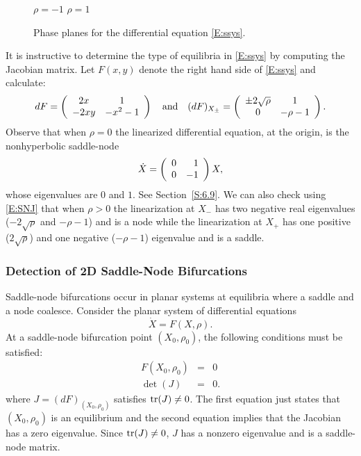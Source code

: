 \documentclass{ximera}
\begin{document}
\begin{figure*}[htb]
           \centerline{%
	   }
		\vspace*{-0.2in}		
		\hspace{1.3in} $\rho=-1$ \hspace{2.1in} $\rho=1$
   \caption{Phase planes for the differential equation \protect\eqref{E:ssys}.}
           \label{F:ssys}
\end{figure*}

It is instructive to determine the type of equilibria in \eqref{E:ssys} by
computing the Jacobian matrix.  Let $F(x,y)$ denote the right hand side of 
\eqref{E:ssys} and calculate:
\begin{equation}  \label{E:SNJ}
dF = \left(\begin{array}{cc} 2x & 1\\ -2xy &-x^2-1\end{array}\right) \quad\mbox{and}\quad 
(dF)_{X_{\pm}}= \left(\begin{array}{cc} \pm 2\sqrt{\rho} & 1\\ 0 &-\rho-1\end{array}\right).
\end{equation}
Observe that when $\rho=0$ the linearized differential equation, at the origin, 
is the nonhyperbolic saddle-node
\[
\dot{X} = \left(\begin{array}{rr} 0 & 1\\ 0 &-1\end{array}\right)X,
\]
whose eigenvalues are $0$ and $1$.  See Section~\ref{S:6.9}. We can also check
using \eqref{E:SNJ} that when $\rho>0$ the linearization at $X_{-}$ has two 
negative real eigenvalues ($-2\sqrt{\rho}$ and $-\rho-1$)  and is a node 
while the linearization at $X_{+}$ has one positive ($2\sqrt{\rho}$) and one 
negative ($-\rho-1$) eigenvalue and is a saddle.


\subsubsection*{Detection of 2D Saddle-Node Bifurcations}

Saddle-node bifurcations occur in planar systems at equilibria  where a 
saddle and a node coalesce.  Consider the planar system of differential 
equations
\[
\dot{X} = F(X,\rho).
\]
At a saddle-node bifurcation point $(X_0,\rho_0)$, the following conditions
must be satisfied:
\begin{equation}  \label{E:DCSN2}
\begin{array}{rcl}
F(X_0,\rho_0) & = & 0\\
\det(J) & = & 0.
\end{array}
\end{equation}
where $J = (dF)_{(X_0,\rho_0)}$ satisfies ${\rm tr}(J)\neq 0$.  The first 
equation just states that $(X_0,\rho_0)$ is an equilibrium and the second 
equation implies that the Jacobian has a zero eigenvalue.  Since 
${\rm tr}(J)\neq 0$, $J$ has a nonzero eigenvalue and is a saddle-node matrix.
\end{document}
